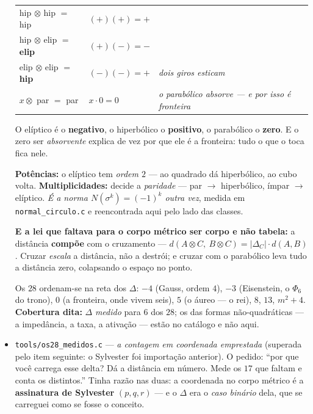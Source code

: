 \documentclass[11pt]{article}
\newcommand{\code}[1]{\texttt{\small #1}}
\theoremstyle{plain}
\theoremstyle{remark}
\begin{document}
\begin{itemize}
\begin{center}\begin{tabular}{lll}
hip $\otimes$ hip $=$ hip & $(+)(+) = +$ & \\
hip $\otimes$ elip $=$ \textbf{elip} & $(+)(-) = -$ & \\
elip $\otimes$ elip $=$ \textbf{hip} & $(-)(-) = +$ & \emph{dois giros esticam} \\
$x \otimes$ par $=$ par & $x\cdot 0 = 0$ & \emph{o parabólico absorve --- e por isso é fronteira} \\
\end{tabular}\end{center}

O elíptico é o \textbf{negativo}, o hiperbólico o \textbf{positivo}, o parabólico o \textbf{zero}.
E o zero ser \emph{absorvente} explica de vez por que ele é a fronteira: tudo o que o toca fica
nele.

\textbf{Potências:} o elíptico tem \emph{ordem $2$} --- ao quadrado dá hiperbólico, ao cubo volta.
\textbf{Multiplicidades:} decide a \emph{paridade} --- par $\to$ hiperbólico, ímpar $\to$ elíptico.
\emph{É a norma $N(\sigma^k) = (-1)^k$ outra vez}, medida em \code{normal\_circulo.c} e reencontrada
aqui pelo lado das classes.

\textbf{E a lei que faltava para o corpo métrico ser corpo e não tabela:} a distância
\textbf{compõe} com o cruzamento --- $d(A{\otimes}C,\ B{\otimes}C) = |\Delta_C|\cdot d(A,B)$. Cruzar
\emph{escala} a distância, não a destrói; e cruzar com o parabólico leva tudo a distância zero,
colapsando o espaço no ponto.

Os $28$ ordenam-se na reta dos $\Delta$: $-4$ (Gauss, ordem $4$), $-3$ (Eisenstein, o $\Phi_6$ do
trono), $0$ (a fronteira, onde vivem seis), $5$ (o áureo --- o rei), $8$, $13$, $m^2{+}4$.
\textbf{Cobertura dita:} $\Delta$ \emph{medido} para $6$ dos $28$; os das formas não-quadráticas
--- a impedância, a taxa, a ativação --- estão no catálogo e não aqui.
\item \code{tools/os28\_medidos.c} --- \emph{a contagem em coordenada emprestada} (superada pelo item seguinte: o Sylvester foi importação anterior). O pedido: ``por que você carrega esse
delta? Dá a distância em número. Mede os $17$ que faltam e conta os distintos.'' Tinha razão nas
duas: a coordenada no corpo métrico é a \textbf{assinatura de Sylvester} $(p,q,r)$ --- e o
$\Delta$ era o \emph{caso binário} dela, que se carreguei como se fosse o conceito.


\end{itemize}
\end{document}
